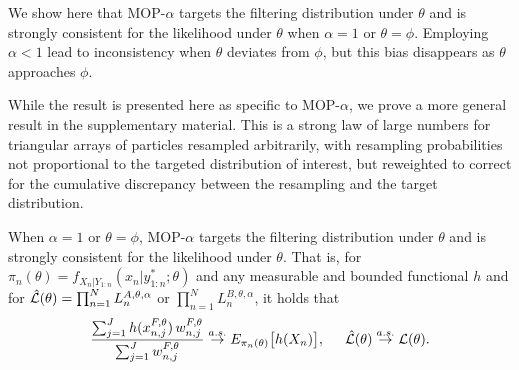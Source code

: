 \documentclass[numsec,webpdf,modern,medium,namedate]{oup-authoring-template}
\newcommand\arxiv[2]{#2} %
\theoremstyle{thmstyleone}%
\theoremstyle{thmstyletwo}%
\theoremstyle{thmstylethree}%
\begin{document}
We show here that MOP-$\alpha$ targets the filtering distribution under $\theta$ and is strongly consistent for the likelihood under $\theta$ when $\alpha=1$ or $\theta=\phi$.
Employing $\alpha<1$ lead to inconsistency when $\theta$ deviates from $\phi$, but this bias disappears as $\theta$ approaches $\phi$.

While the result is presented here as specific to MOP-$\alpha$, we prove a more general result in \arxiv{Appendix~\ref{appendix:targeting}}{the supplementary material}.
This is a strong law of large numbers for triangular arrays of particles resampled arbitrarily, with resampling probabilities not proportional to the targeted distribution of interest, but reweighted to correct for the cumulative discrepancy between the resampling and the target distribution.


\begin{thm}
    \label{thm:mop-targeting}
    When $\alpha=1$ or $\theta=\phi$, MOP-$\alpha$ targets the filtering distribution under $\theta$ and is strongly consistent for the likelihood under $\theta$. That is, for $\pi_n(\theta)=f_{X_{n}|Y_{1:n}}(x_n|y_{1:n}^* ; \theta)$ and any measurable and bounded functional $h$ and for $\hat{\mathcal{L}}(\theta) = \prod_{n=1}^N L_n^{A,\theta,\alpha}$ or $\prod_{n=1}^N L_n^{B,\theta,\alpha}$, it holds that
    \arxiv{}{\vspace*{-1.5mm}}
    \begin{equation} \nonumber
        \frac{\sum_{j=1}^J h(x_{n,j}^{F, \theta}) \, w_{n,j}^{F,\theta}}{\sum_{j=1}^J w_{n,j}^{F,\theta}} \stackrel{a.s.}{\to} E_{\pi_n(\theta)} \big[h(X_n)\big], \hspace{5mm} \hat\lik(\theta)  \stackrel{a.s.}{\to} \lik(\theta).
    \arxiv{}{\vspace*{-1.5mm}}
    \end{equation}
\end{thm}

\end{document}
